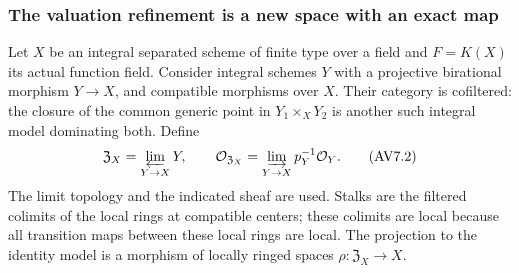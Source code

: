 \subsubsection{The valuation refinement is a new space with an exact map}

Let $X$ be an integral separated scheme of finite type over a field and
$F=K(X)$ its actual function field. Consider integral schemes $Y$ with
a projective birational morphism $Y\to X$, and compatible morphisms
over $X$. Their category is cofiltered: the closure of the common
generic point in $Y_1\times_XY_2$ is another such integral model
dominating both. Define
\[
 \mathfrak Z_X=\varprojlim_{Y\to X}Y,\qquad
 \mathcal O_{\mathfrak Z_X}
   =\varinjlim_{Y\to X}p_Y^{-1}\mathcal O_Y.
 \tag{AV7.2}\label{eq:valuation-refinement}
\]
The limit topology and the indicated sheaf are used. Stalks are the
filtered colimits of the local rings at compatible centers; these
colimits are local because all transition maps between these local
rings are local. The projection to the identity model is a morphism of
locally ringed spaces $\rho:\mathfrak Z_X\to X$.

